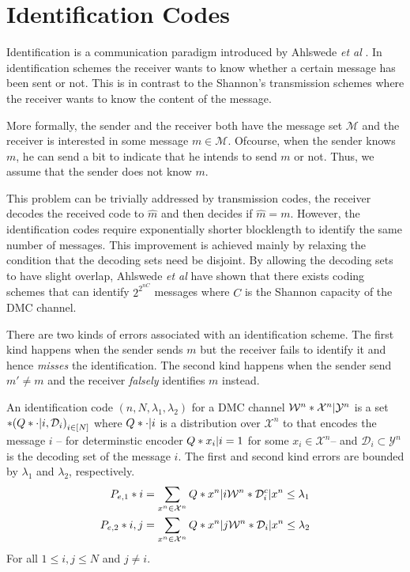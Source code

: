 \section{Identification Codes}
Identification is a communication paradigm introduced by Ahlswede \textit{et al} \cite{idfeedback}. In identification schemes the receiver wants to know whether a certain message has been sent or not. This is in contrast to the Shannon's transmission schemes where the receiver wants to know the content of the message. 

More formally, the sender and the receiver both have the message set \(\mathcal{M}\) and the receiver is interested in some message \(m \in \mathcal{M}\). Ofcourse, when the sender knows \(m\), he can send a bit to indicate that he intends to send \(m\) or not. Thus, we assume that the sender does not know \(m\). 

This problem can be trivially addressed by transmission codes, the receiver decodes the received code to \(\hat{m}\) and then decides if \(\hat{m} = m\). However, the   identification codes require exponentially shorter blocklength to identify the same number of messages. This improvement is achieved mainly by relaxing the condition that the decoding sets need be disjoint. By allowing the decoding sets to have slight overlap, Ahlswede \textit{et al} \cite{idfeedback} have shown that there exists coding schemes that can identify \(2^{2^{nC}}\) messages where \(C\) is the Shannon capacity of the DMC channel.

There are two kinds of errors associated with an identification scheme. The first kind happens when the sender sends \(m\) but the receiver fails to identify it and hence \textit{misses} the identification. The second kind happens when the sender send \(m' \neq m\) and the receiver \textit{falsely} identifies \(m\) instead.

\begin{definition}\label{def:idcode}
	An identification code \((n, N,\lambda_1, \lambda_2)\) for a DMC channel \(\func{\mathcal{W}^n}{\mathcal{X}^n | \mathcal{Y}^n}\) is a set \(\set{ (\func{Q}{ \cdot |i} ,\mathcal{D}_i)}_{i \in [N]}\) where \(\func{Q}{ \cdot |i}\) is a distribution over \(\mathcal{X}^n\) to that encodes the message \(i\) -- for determinstic encoder \(\func{Q}{ x_i |i} = 1\)  for some \(x_i \in \mathcal{X}^n\)-- and \(\mathcal{D}_i \subset \mathcal{Y}^n\) is the decoding set of the message \(i\). The first and second kind errors are bounded by \(\lambda_1\) and \(\lambda_2\), respectively.
	\begin{align}
		\func{P_{e,1}}{i} &= \sum_{x^n \in \mathcal{X}^n} \func{Q}{ x^n |i} \func{\mathcal{W}^n}{\mathcal{D}_i^c | x^n} \leq \lambda_1 \\
		\func{P_{e,2}}{i,j}&=\sum_{x^n \in \mathcal{X}^n} \func{Q}{ x^n |j} \func{\mathcal{W}^n}{\mathcal{D}_i | x^n} \leq \lambda_2
	\end{align}
	For all \(1 \leq i,j \leq N\) and \(j \neq i\).
\end{definition}

